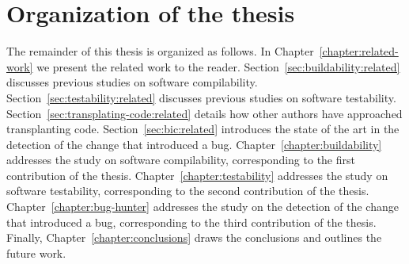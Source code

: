 \section{Organization of the thesis}

The remainder of this thesis is organized as follows.
In Chapter~\ref{chapter:related-work} we present the related work to the reader. 
Section~\ref{sec:buildability:related} discusses previous studies on software compilability. 
Section~\ref{sec:testability:related} discusses previous studies on software testability. 
Section~\ref{sec:transplating-code:related} details how other authors have approached transplanting code. 
Section~\ref{sec:bic:related} introduces the state of the art in the detection of the change that introduced a bug.
Chapter~\ref{chapter:buildability} addresses the study on software compilability, corresponding to the first contribution of the thesis.
Chapter~\ref{chapter:testability} addresses the study on software testability, corresponding to the second contribution of the thesis.
Chapter~\ref{chapter:bug-hunter} addresses the study on the detection of the change that introduced a bug, corresponding to the third contribution of the thesis.
Finally, Chapter~\ref{chapter:conclusions} draws the conclusions and outlines the future work.
